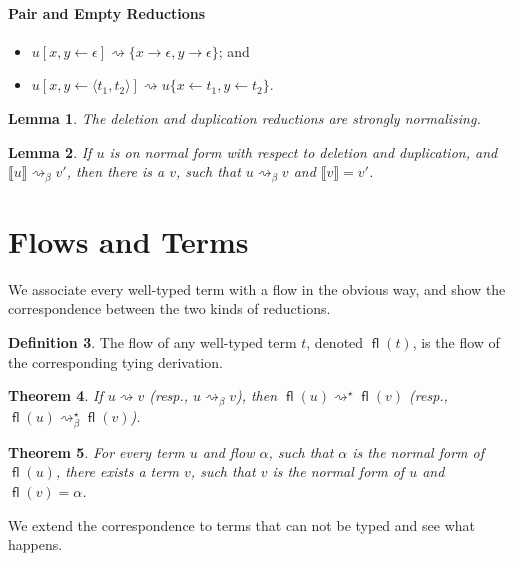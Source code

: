 \documentclass[11pt,a4paper]{article}
\theoremstyle{definition}
\newtheorem{definition}{Definition}
\theoremstyle{plain}
\newtheorem{lemma}[definition]{Lemma}
\newtheorem{theorem}[definition]{Theorem}
\theoremstyle{remark}
\begin{document}
\paragraph{Pair and Empty Reductions}

\begin{itemize}
	\item $u[x,y\leftarrow\epsilon]\rightsquigarrow\{x\rightarrow\epsilon,y\rightarrow\epsilon\}$; and
	\item $u[x,y\leftarrow\langle t_1,t_2\rangle]\rightsquigarrow u\{x\leftarrow t_1,y\leftarrow t_2\}$.
\end{itemize}

\begin{lemma}
	The deletion and duplication reductions are strongly normalising.
\end{lemma}

\begin{lemma}
	If $u$ is on normal form with respect to deletion and duplication, and $\llbracket u\rrbracket\rightsquigarrow_\beta v'$, then there is a $v$, such that $u\rightsquigarrow_\beta v$ and $\llbracket v\rrbracket=v'$.
\end{lemma}


\section{Flows and Terms}

We associate every well-typed term with a flow in the obvious way, and show the correspondence between the two kinds of reductions.

\newcommand{\fl}{{\mathop{\mathsf{fl}}}}

\begin{definition}
	The flow of any well-typed term $t$, denoted $\fl(t)$, is the flow of the corresponding tying derivation.
\end{definition}

\begin{theorem}
	If $u\rightsquigarrow v$ (resp., $u\rightsquigarrow_\beta v$), then $\fl(u)\rightsquigarrow^\star\fl(v)$ (resp., $\fl(u)\rightsquigarrow^\star_\beta\fl(v)$).
\end{theorem}

\begin{theorem}
	For every term $u$ and flow $\alpha$, such that $\alpha$ is the normal form of $\fl(u)$, there exists a term $v$, such that $v$ is the normal form of $u$ and $\fl(v)=\alpha$.
\end{theorem}

We extend the correspondence to terms that can not be typed and see what happens.
\end{document}
